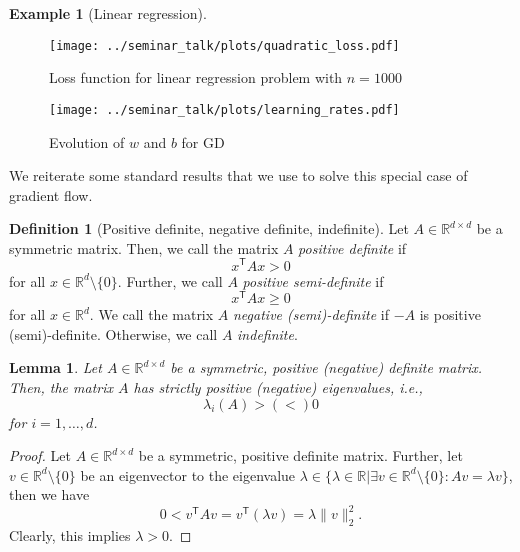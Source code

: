\documentclass[12pt]{article}
\newtheorem{lemma}[lemma]{Lemma}
\theoremstyle{definition}
\newtheorem{example}[example]{Example}
\newtheorem{definition}[definition]{Definition}
\numberwithin{equation}{section}
\newcommand{\R}{\mathbb{R}}
\newcommand{\T}{\mathsf{T}}
\newcommand{\norm}[1]{\lVert{#1}\rVert_2}
\begin{document}
\begin{example}[Linear regression]
  \begin{figure}[htb]
    \centering
    \texttt{[image: ../seminar\_talk/plots/quadratic\_loss.pdf]}
    \caption{Loss function for linear regression problem with $n=1000$}
    \label{fig:quadratic_loss_function}
  \end{figure}

  \begin{figure}[htb]
    \centering
    \texttt{[image: ../seminar\_talk/plots/learning\_rates.pdf]}
    \caption{Evolution of $w$ and $b$ for GD}
    \label{fig:learning_rates}
  \end{figure}

 
\end{example}

We reiterate some standard results that we use to solve this special case of gradient flow.
\begin{definition}[Positive definite, negative definite, indefinite]
  \label{def:pos_neg_def}
  Let $A \in \R^{d \times d}$ be a symmetric matrix. Then, we call the matrix $A$ \emph{positive definite} if
  \begin{equation*}
    x^\T A x > 0
  \end{equation*}
  for all $x \in \R^d \setminus \{0\}$. Further, we call $A$ \emph{positive semi-definite} if
  \begin{equation*}
    x^\T A x \geq 0
  \end{equation*}
  for all $x \in \R^d$. We call the matrix $A$ \emph{negative (semi)-definite} if $-A$ is positive (semi)-definite.
  Otherwise, we call $A$ \emph{indefinite}.
\end{definition}
\begin{lemma}
  \label{lem:positive_eigen_values}
  Let $A \in \R^{d \times d}$ be a symmetric, positive (negative) definite matrix. Then, the matrix $A$ has strictly positive (negative) eigenvalues, i.e.,
  \begin{equation*}
    \lambda_i(A) > (<) 0
  \end{equation*}
  for $i = 1, \dots, d$.
\end{lemma}
\begin{proof}
  Let $A \in \R^{d \times d}$ be a symmetric, positive definite matrix. Further, let $v \in \R^d \setminus \{0\}$ be an eigenvector to the eigenvalue $\lambda \in \{\lambda \in \R | \exists v \in \R^d \setminus \{0\}: Av = \lambda v \}$, then we have
  \begin{equation*}
    0 < v^\T A v = v^\T (\lambda v) = \lambda \norm{v}^2.
  \end{equation*}
  Clearly, this implies $\lambda > 0$.
\end{proof}
\end{document}
